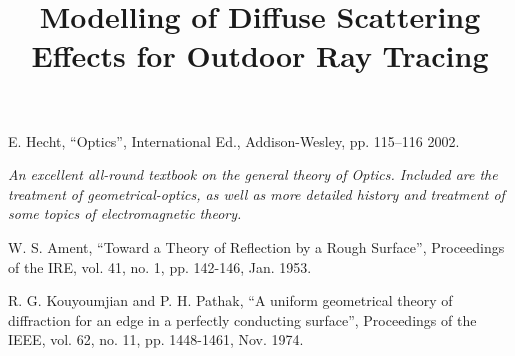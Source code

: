 \documentclass{article}
\begin{document}
\title{Modelling of Diffuse Scattering Effects for Outdoor Ray Tracing}
\begin{thebibliography}{1}

E. Hecht, ``Optics'', International Ed., Addison-Wesley, pp. 115--116 2002.

{\it{An excellent all-round textbook on the general theory of Optics. Included are the treatment of geometrical-optics, as well as more detailed history and treatment of some topics of electromagnetic theory. }}

W. S. Ament, ``Toward a Theory of Reflection by a Rough Surface'', Proceedings of the IRE, vol. 41, no. 1, pp. 142-146, Jan. 1953.

R. G. Kouyoumjian and P. H. Pathak, ``A uniform geometrical theory of diffraction for an edge in a perfectly conducting surface'', Proceedings of the IEEE, vol. 62, no. 11, pp. 1448-1461, Nov. 1974.
\end{thebibliography}
\end{document}
